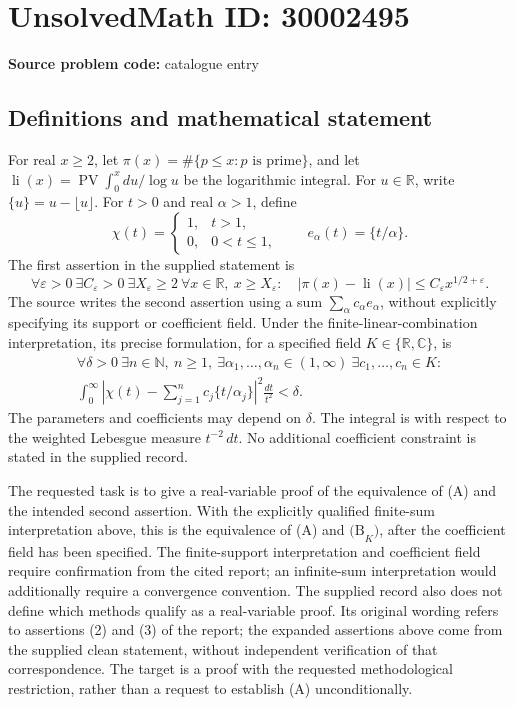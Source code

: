 \documentclass[11pt]{article}
\newcommand{\N}{\mathbb{N}}
\newcommand{\R}{\mathbb{R}}
\newcommand{\C}{\mathbb{C}}
\begin{document}
\section*{UnsolvedMath ID: 30002495}
\textbf{Source problem code:} catalogue entry
\subsection{Definitions and mathematical statement}
For real \(x\geq 2\), let \(\pi(x)=\#\{p\leq x:p\text{ is prime}\}\), and let \(\operatorname{li}(x)=\operatorname{PV}\int_0^x du/\log u\) be the logarithmic integral. For \(u\in\R\), write \(\{u\}=u-\lfloor u\rfloor\). For \(t>0\) and real \(\alpha>1\), define
\[
\chi(t)=\begin{cases}1,&t>1,\\0,&0<t\leq 1,\end{cases}
\qquad e_\alpha(t)=\{t/\alpha\}.
\]
The first assertion in the supplied statement is
\[
\tag{A}
\forall\varepsilon>0\ \exists C_\varepsilon>0\ \exists X_\varepsilon\geq2\ \forall x\in\R,\ x\geq X_\varepsilon:
\quad |\pi(x)-\operatorname{li}(x)|\leq C_\varepsilon x^{1/2+\varepsilon}.
\]
The source writes the second assertion using a sum \(\sum_\alpha c_\alpha e_\alpha\), without explicitly specifying its support or coefficient field. Under the finite-linear-combination interpretation, its precise formulation, for a specified field \(K\in\{\R,\C\}\), is
\[
\tag{B\(_K\)}
\begin{gathered}
\forall\delta>0\ \exists n\in\N,\ n\geq1,\ \exists\alpha_1,\ldots,\alpha_n\in(1,\infty)\ \exists c_1,\ldots,c_n\in K:\\
\int_0^\infty\left|\chi(t)-\sum_{j=1}^n c_j\{t/\alpha_j\}\right|^2\frac{dt}{t^2}<\delta.
\end{gathered}
\]
The parameters and coefficients may depend on \(\delta\). The integral is with respect to the weighted Lebesgue measure \(t^{-2}\,dt\). No additional coefficient constraint is stated in the supplied record.

The requested task is to give a real-variable proof of the equivalence of (A) and the intended second assertion. With the explicitly qualified finite-sum interpretation above, this is the equivalence of (A) and \(\mathrm{(B}_K\mathrm{)}\), after the coefficient field has been specified. The finite-support interpretation and coefficient field require confirmation from the cited report; an infinite-sum interpretation would additionally require a convergence convention. The supplied record also does not define which methods qualify as a real-variable proof. Its original wording refers to assertions (2) and (3) of the report; the expanded assertions above come from the supplied clean statement, without independent verification of that correspondence. The target is a proof with the requested methodological restriction, rather than a request to establish (A) unconditionally.
\end{document}
